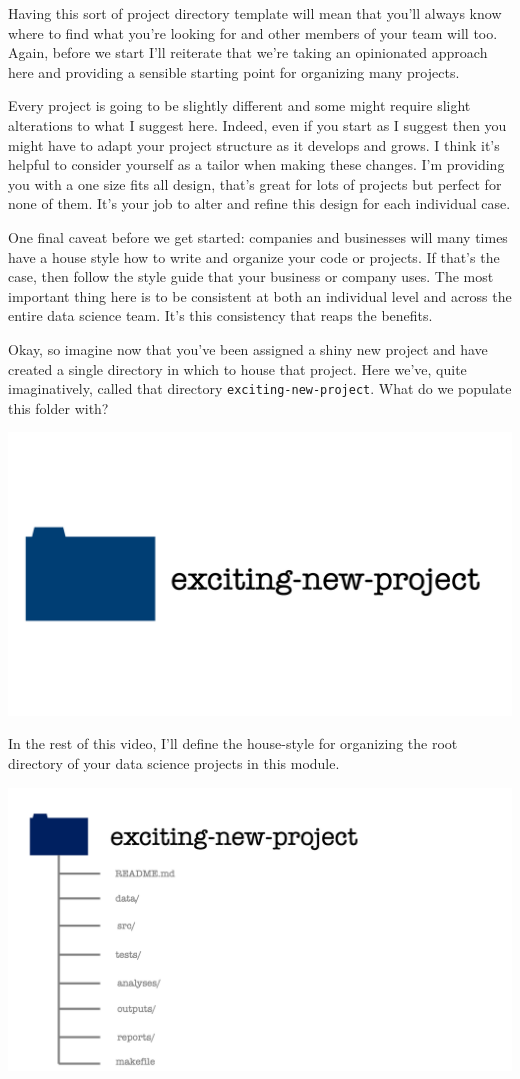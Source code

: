 \documentclass[
  12pt,
]{book}
\begin{document}
Having this sort of project directory template will mean that you'll always know where to find what you're looking for and other members of your team will too. Again, before we start I'll reiterate that we're taking an opinionated approach here and providing a sensible starting point for organizing many projects.

Every project is going to be slightly different and some might require slight alterations to what I suggest here. Indeed, even if you start as I suggest then you might have to adapt your project structure as it develops and grows. I think it's helpful to consider yourself as a tailor when making these changes. I'm providing you with a one size fits all design, that's great for lots of projects but perfect for none of them. It's your job to alter and refine this design for each individual case.

One final caveat before we get started: companies and businesses will many times have a house style how to write and organize your code or projects. If that's the case, then follow the style guide that your business or company uses. The most important thing here is to be consistent at both an individual level and across the entire data science team. It's this consistency that reaps the benefits.

Okay, so imagine now that you've been assigned a shiny new project and have created a single directory in which to house that project. Here we've, quite imaginatively, called that directory \texttt{exciting-new-project}. What do we populate this folder with?

\includegraphics[width=0.8\linewidth]{images/101-workflows-organising-your-work/directory-structure-drawings/directory-structure-drawing-3}

In the rest of this video, I'll define the house-style for organizing the root directory of your data science projects in this module.

\includegraphics[width=0.8\linewidth]{images/101-workflows-organising-your-work/directory-structure-drawings/directory-structure-drawing-4}
\end{document}
